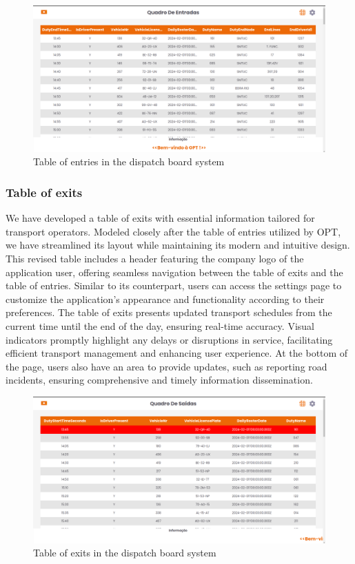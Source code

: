 \documentclass[10pt]{article}
\begin{document}
        \begin{figure}[h]
            \centering
            \includegraphics[width=1\textwidth]{table_of_entries}
            \caption{Table of entries in the dispatch board system}
            \label{fig:table_of_entries}
        \end{figure}

        \subsubsection{Table of exits}

        We have developed a table of exits with essential information tailored for transport operators. Modeled closely after the table of entries utilized by OPT, we have streamlined its layout while maintaining its modern and intuitive design. This revised table includes a header featuring the company logo of the application user, offering seamless navigation between the table of exits and the table of entries.
        Similar to its counterpart, users can access the settings page to customize the application's appearance and functionality according to their preferences. The table of exits presents updated transport schedules from the current time until the end of the day, ensuring real-time accuracy. Visual indicators promptly highlight any delays or disruptions in service, facilitating efficient transport management and enhancing user experience.
        At the bottom of the page, users also have an area to provide updates, such as reporting road incidents, ensuring comprehensive and timely information dissemination.


        \begin{figure}[h]
            \centering
            \includegraphics[width=1\textwidth]{table_of_exits}
            \caption{Table of exits in the dispatch board system}
            \label{fig:table_of_exits}
        \end{figure}
        \vfill
\end{document}
